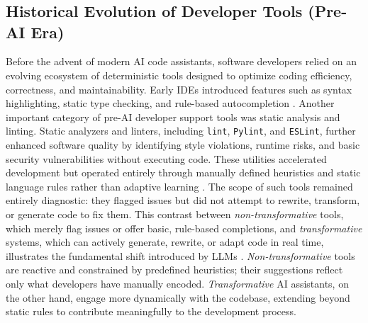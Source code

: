 \chapter{}%
\label{ch:stand-van-zaken}



\section{Historical Evolution of Developer Tools (Pre-AI Era)}
\label{sec:historical-developer-tools}
Before the advent of modern \gls{AI} code assistants, software developers relied on an evolving ecosystem of deterministic tools designed to optimize coding efficiency, correctness, and maintainability. Early \glspl{IDE} introduced features such as syntax highlighting, static type checking, and rule-based autocompletion \autocite{murphy2006ideusage}. Another important category of pre-\gls{AI} developer support tools was static analysis and linting. Static analyzers and linters, including \texttt{lint}, \texttt{Pylint}, and \texttt{ESLint}, further enhanced software quality by identifying style violations, runtime risks, and basic security vulnerabilities without executing code. These utilities accelerated development but operated entirely through manually defined heuristics and static language rules rather than adaptive learning \autocite{ayewah2008findbugs}. The scope of such tools remained entirely diagnostic: they flagged issues but did not attempt to rewrite, transform, or generate code to fix them. This contrast between \emph{non-transformative} tools, which merely flag issues or offer basic, rule-based completions, and \emph{transformative} systems, which can actively generate, rewrite, or adapt code in real time, illustrates the fundamental shift introduced by \glspl{LLM} \autocite{xu2022systematic}. \emph{Non-transformative}  tools are reactive and constrained by predefined heuristics; their suggestions reflect only what developers have manually encoded. \emph{Transformative} \gls{AI} assistants, on the other hand, engage more dynamically with the codebase, extending beyond static rules to contribute meaningfully to the development process.

